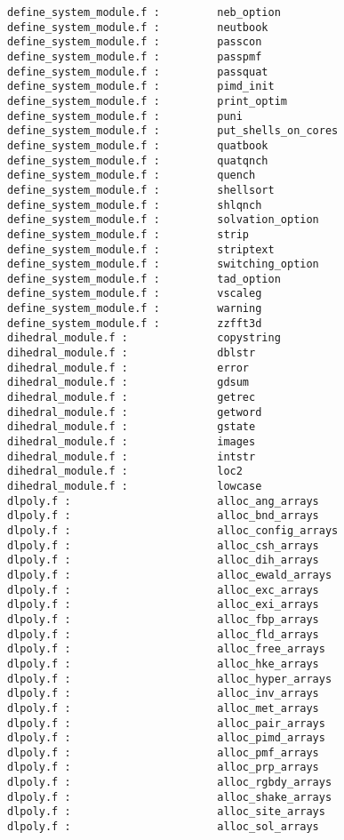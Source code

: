 \begin{verbatim}
define_system_module.f :         neb_option 
define_system_module.f :         neutbook 
define_system_module.f :         passcon 
define_system_module.f :         passpmf 
define_system_module.f :         passquat 
define_system_module.f :         pimd_init 
define_system_module.f :         print_optim 
define_system_module.f :         puni
define_system_module.f :         put_shells_on_cores 
define_system_module.f :         quatbook 
define_system_module.f :         quatqnch 
define_system_module.f :         quench 
define_system_module.f :         shellsort 
define_system_module.f :         shlqnch 
define_system_module.f :         solvation_option 
define_system_module.f :         strip 
define_system_module.f :         striptext 
define_system_module.f :         switching_option 
define_system_module.f :         tad_option 
define_system_module.f :         vscaleg 
define_system_module.f :         warning 
define_system_module.f :         zzfft3d 
dihedral_module.f :              copystring 
dihedral_module.f :              dblstr
dihedral_module.f :              error 
dihedral_module.f :              gdsum 
dihedral_module.f :              getrec 
dihedral_module.f :              getword 
dihedral_module.f :              gstate 
dihedral_module.f :              images 
dihedral_module.f :              intstr
dihedral_module.f :              loc2
dihedral_module.f :              lowcase 
dlpoly.f :                       alloc_ang_arrays 
dlpoly.f :                       alloc_bnd_arrays 
dlpoly.f :                       alloc_config_arrays 
dlpoly.f :                       alloc_csh_arrays 
dlpoly.f :                       alloc_dih_arrays 
dlpoly.f :                       alloc_ewald_arrays 
dlpoly.f :                       alloc_exc_arrays 
dlpoly.f :                       alloc_exi_arrays 
dlpoly.f :                       alloc_fbp_arrays 
dlpoly.f :                       alloc_fld_arrays 
dlpoly.f :                       alloc_free_arrays 
dlpoly.f :                       alloc_hke_arrays 
dlpoly.f :                       alloc_hyper_arrays 
dlpoly.f :                       alloc_inv_arrays 
dlpoly.f :                       alloc_met_arrays 
dlpoly.f :                       alloc_pair_arrays 
dlpoly.f :                       alloc_pimd_arrays 
dlpoly.f :                       alloc_pmf_arrays 
dlpoly.f :                       alloc_prp_arrays 
dlpoly.f :                       alloc_rgbdy_arrays 
dlpoly.f :                       alloc_shake_arrays 
dlpoly.f :                       alloc_site_arrays 
dlpoly.f :                       alloc_sol_arrays 

\end{verbatim}
